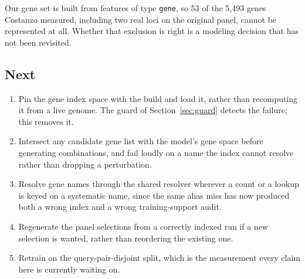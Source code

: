 Our gene set is built from features of type \texttt{gene}, so 53 of the 5{,}493
genes Costanzo measured, including two real loci on the original panel, cannot be
represented at all. Whether that exclusion is right is a modeling decision that
has not been revisited.

\subsection{Next}

\begin{enumerate}
\item Pin the gene index space with the build and load it, rather than
  recomputing it from a live genome. The guard of Section~\ref{sec:guard} detects
  the failure; this removes it.
\item Intersect any candidate gene list with the model's gene space before
  generating combinations, and fail loudly on a name the index cannot resolve
  rather than dropping a perturbation.
\item Resolve gene names through the shared resolver wherever a count or a lookup
  is keyed on a systematic name, since the same alias miss has now produced both
  a wrong index and a wrong training-support audit.
\item Regenerate the panel selections from a correctly indexed run if a new
  selection is wanted, rather than reordering the existing one.
\item Retrain on the query-pair-disjoint split, which is the measurement every
  claim here is currently waiting on.
\end{enumerate}
